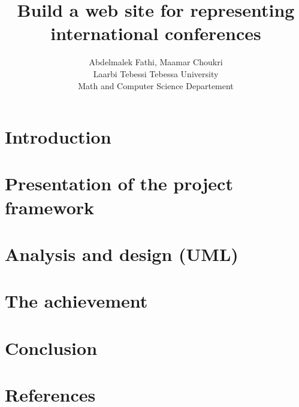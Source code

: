 \documentclass{article}
\title{Build a web site for representing international conferences}
\author{Abdelmalek Fathi, Maamar Choukri\\
Laarbi Tebessi Tebessa University\\
Math and Computer Science Departement}
\date{}
\begin{document}
	\maketitle
	\clearpage
	\tableofcontents
	\clearpage
	\section{Introduction}
	
	\clearpage
	\section{Presentation of the project framework}
	
	\clearpage
	\section{Analysis and design (UML)}
	
	\clearpage
	\section{The achievement}
	
	\clearpage
	\section{Conclusion}
	
	\clearpage
	\section{References}
	
\end{document}
